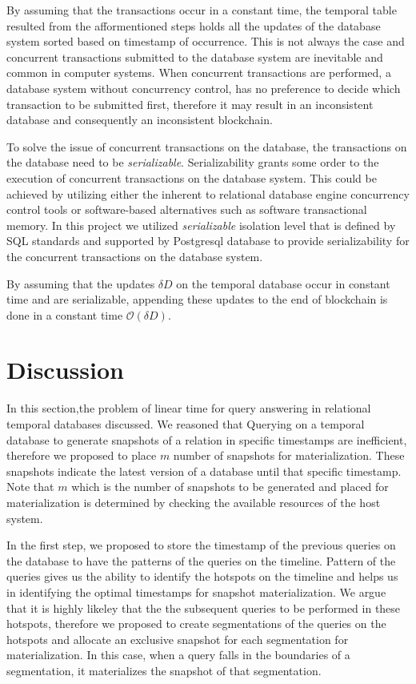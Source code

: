 		By assuming that the transactions occur in a constant time, the temporal table resulted from the afformentioned steps holds all the updates of the database system sorted based on timestamp of occurrence. This is not always the case and concurrent transactions submitted to the database system are inevitable and common in computer systems.
		When concurrent transactions are performed, a database system without concurrency control, has no preference to decide which transaction to be submitted first, therefore it may result in an inconsistent database and consequently an inconsistent blockchain. 

		To solve the issue of concurrent transactions on the database, the transactions on the database need to be {\it serializable}. Serializability grants some order to the execution of concurrent transactions on the database system. This could be achieved by utilizing either the inherent to relational database engine concurrency control tools or software-based alternatives such as software transactional memory. In this project we utilized {\it serializable} isolation level that is defined by SQL standards and supported by Postgresql database to provide serializability for the concurrent transactions on the database system.

		\begin{prop} By assuming that the updates $\delta D$ on the temporal database occur in constant time and are serializable, appending these updates to the end of blockchain is done in a constant time $\mathcal{O}(\delta D)$.
		\end{prop}

	\section{Discussion} \label{sec:algorithm_discussion}
		In this section,the problem of linear time for query answering in relational temporal databases discussed. We reasoned that Querying on a temporal database to generate snapshots of a relation in specific timestamps are inefficient, therefore we proposed to place $m$ number of snapshots for materialization. These snapshots indicate the latest version of a database until that specific timestamp. Note that $m$ which is the number of snapshots to be generated and placed for materialization is determined by checking the available resources of the host system.

		In the first step, we proposed to store the timestamp of the previous queries on the database to have the patterns of the queries on the timeline. Pattern of the queries gives us the ability to identify the hotspots on the timeline and helps us in identifying the optimal timestamps for snapshot materialization. We argue that it is highly likeley that the the subsequent queries to be performed in these hotspots, therefore we proposed to create segmentations of the queries on the hotspots and allocate an exclusive snapshot for each segmentation for materialization. In this case, when a query falls in the boundaries of a segmentation, it materializes the snapshot of that segmentation.

